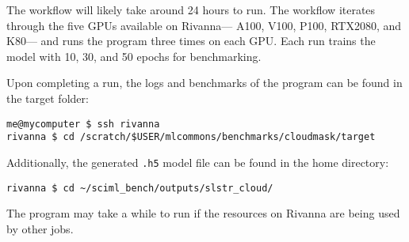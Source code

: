 The workflow will likely take around 24 hours to run. The workflow iterates through the five GPUs available on Rivanna---
A100, V100, P100, RTX2080, and K80--- and runs the program three times
on each GPU. Each run trains the model with 10, 30, and 50 epochs for
benchmarking.

Upon completing a run, the logs and benchmarks of the program can be
found in the target folder:

\smallskip
\begin{verbatim}
me@mycomputer $ ssh rivanna
rivanna $ cd /scratch/$USER/mlcommons/benchmarks/cloudmask/target
\end{verbatim}
\smallskip

Additionally, the generated \texttt{.h5} model file can be found in the
home directory:

\smallskip
\begin{verbatim}
rivanna $ cd ~/sciml_bench/outputs/slstr_cloud/
\end{verbatim}
\smallskip

The program may take a while to run if the resources on Rivanna are
being used by other jobs.
